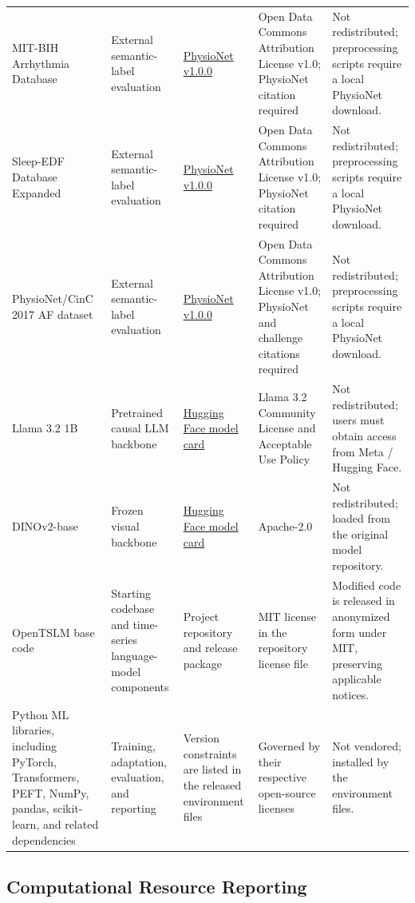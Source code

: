\documentclass{article}
\begin{document}
\begin{longtable}{p{2.0cm}p{1.7cm}p{3.0cm}p{3.0cm}p{2.7cm}}
MIT-BIH Arrhythmia Database & External semantic-label evaluation & \href{https://physionet.org/content/mitdb/1.0.0/}{PhysioNet v1.0.0} & Open Data Commons Attribution License v1.0; PhysioNet citation required & Not redistributed; preprocessing scripts require a local PhysioNet download. \\
Sleep-EDF Database Expanded & External semantic-label evaluation & \href{https://physionet.org/content/sleep-edfx/1.0.0/}{PhysioNet v1.0.0} & Open Data Commons Attribution License v1.0; PhysioNet citation required & Not redistributed; preprocessing scripts require a local PhysioNet download. \\
PhysioNet/CinC 2017 AF dataset & External semantic-label evaluation & \href{https://physionet.org/content/challenge-2017/1.0.0/}{PhysioNet v1.0.0} & Open Data Commons Attribution License v1.0; PhysioNet and challenge citations required & Not redistributed; preprocessing scripts require a local PhysioNet download. \\
Llama 3.2 1B & Pretrained causal LLM backbone & \href{https://huggingface.co/meta-llama/Llama-3.2-1B}{Hugging Face model card} & Llama 3.2 Community License and Acceptable Use Policy & Not redistributed; users must obtain access from Meta / Hugging Face. \\
DINOv2-base & Frozen visual backbone & \href{https://huggingface.co/facebook/dinov2-base}{Hugging Face model card} & Apache-2.0 & Not redistributed; loaded from the original model repository. \\
OpenTSLM base code & Starting codebase and time-series language-model components & Project repository and release package & MIT license in the repository license file & Modified code is released in anonymized form under MIT, preserving applicable notices. \\
Python ML libraries, including PyTorch, Transformers, PEFT, NumPy, pandas, scikit-learn, and related dependencies & Training, adaptation, evaluation, and reporting & Version constraints are listed in the released environment files & Governed by their respective open-source licenses & Not vendored; installed by the environment files. \\
\end{longtable}
\endgroup

\subsection{Computational Resource Reporting}
\label{app:compute-budget}
\end{document}
